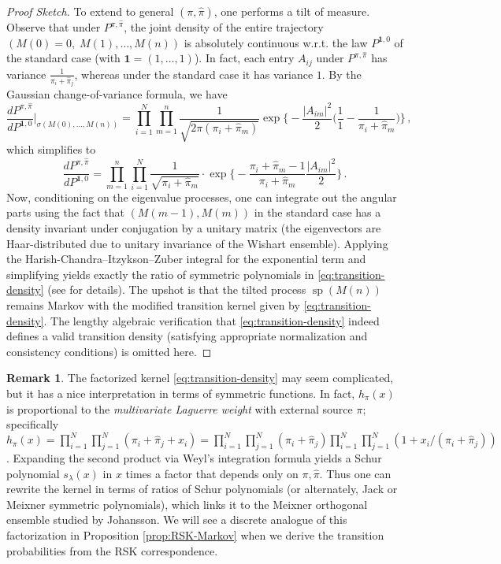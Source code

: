 \documentclass[letterpaper,11pt,oneside,reqno]{article}
\numberwithin{equation}{section}
\theoremstyle{definition}
\newtheorem{remark}[proposition]{Remark}
\begin{document}
\begin{proof}[Proof Sketch]
To extend to general $(\pi,\hat\pi)$, one performs a tilt of measure. Observe that under $P^{\pi,\hat\pi}$, the joint density of the entire trajectory $(M(0)=0,\;M(1),\dots,M(n))$ is absolutely continuous w.r.t. the law $P^{\mathbf{1},0}$ of the standard case (with $\mathbf{1}=(1,\dots,1)$). In fact, each entry $A_{ij}$ under $P^{\pi,\hat\pi}$ has variance $\frac{1}{\pi_i+\hat\pi_j}$, whereas under the standard case it has variance $1$. By the Gaussian change-of-variance formula, we have
\[
\frac{dP^{\pi,\hat\pi}}{dP^{\mathbf{1},0}}\Big|_{\sigma(M(0),\ldots,M(n))} = \prod_{i=1}^N \prod_{m=1}^n \frac{1}{\sqrt{2\pi(\pi_i+\hat\pi_m)}} \exp\!\Big\{-\frac{|A_{im}|^2}{2}\Big(\frac{1}{1} - \frac{1}{\pi_i+\hat\pi_m}\Big)\Big\}\,,
\]
which simplifies to
\[
\frac{dP^{\pi,\hat\pi}}{dP^{\mathbf{1},0}} = \prod_{m=1}^n \prod_{i=1}^N \frac{1}{\sqrt{\pi_i+\hat\pi_m}} \cdot \exp\!\Big\{-\frac{\pi_i+\hat\pi_m - 1}{\pi_i+\hat\pi_m}\frac{|A_{im}|^2}{2}\Big\}\,.
\]
Now, conditioning on the eigenvalue processes, one can integrate out the angular parts using the fact that $(M(m-1),M(m))$ in the standard case has a density invariant under conjugation by a unitary matrix (the eigenvectors are Haar-distributed due to unitary invariance of the Wishart ensemble). Applying the Harish-Chandra--Itzykson--Zuber integral for the exponential term and simplifying yields exactly the ratio of symmetric polynomials in \eqref{eq:transition-density} (see \cite[Sec.~3]{diekerWarren2008determinantal} for details). The upshot is that the tilted process $\operatorname{sp}(M(n))$ remains Markov with the modified transition kernel given by \eqref{eq:transition-density}. The lengthy algebraic verification that \eqref{eq:transition-density} indeed defines a valid transition density (satisfying appropriate normalization and consistency conditions) is omitted here.
\end{proof}

\begin{remark}
The factorized kernel \eqref{eq:transition-density} may seem complicated, but it has a nice interpretation in terms of symmetric functions. In fact, $h_\pi(x)$ is proportional to the \emph{multivariate Laguerre weight} with external source $\pi$; specifically $h_\pi(x) = \prod_{i=1}^N \prod_{j=1}^N (\pi_i + \hat\pi_j + x_i) = \prod_{i=1}^N \prod_{j=1}^N (\pi_i + \hat\pi_j) \prod_{i=1}^N \prod_{j=1}^N (1 + x_i/(\pi_i + \hat\pi_j))$. Expanding the second product via Weyl's integration formula yields a Schur polynomial $s_\lambda(x)$ in $x$ times a factor that depends only on $\pi,\hat\pi$. Thus one can rewrite the kernel in terms of ratios of Schur polynomials (or alternately, Jack or Meixner symmetric polynomials), which links it to the Meixner orthogonal ensemble studied by Johansson. We will see a discrete analogue of this factorization in Proposition \ref{prop:RSK-Markov} when we derive the transition probabilities from the RSK correspondence.
\end{remark}
\end{document}
